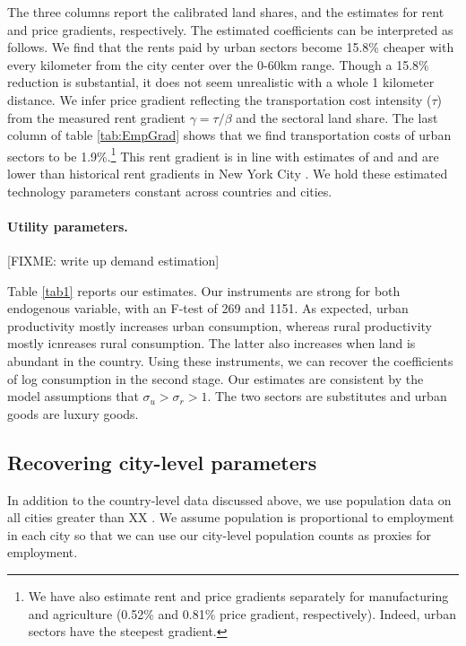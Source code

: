 \documentclass[12pt]{article}
\begin{document}
The three columns report the calibrated land shares, and the estimates for rent and price gradients, respectively. The estimated coefficients can be interpreted as follows. We find that the rents paid by urban sectors become 15.8\% cheaper with every kilometer from the city center over the 0-60km range. Though a 15.8\% reduction is substantial, it does not seem unrealistic with a whole 1 kilometer distance. We infer price gradient reflecting the transportation cost intensity ($\tau$) from the measured rent gradient $\gamma=\tau/\beta$ and the sectoral land share. The last column of table \ref{tab:EmpGrad} shows that we find transportation costs of urban sectors to be 1.9\%.\footnote{We have also estimate rent and price gradients separately for manufacturing and agriculture (0.52\% and 0.81\% price gradient, respectively). Indeed, urban sectors have the steepest gradient.} This rent gradient is in line with estimates of  and  and are lower than historical rent gradients in New York City \cite{Atack1998}. We hold these estimated technology parameters constant across countries and cities.

\paragraph{Utility parameters.}
[FIXME: write up demand estimation]



Table \ref{tab1} reports our estimates. Our instruments are strong for both endogenous variable, with an F-test of 269 and 1151. As expected, urban productivity mostly increases urban consumption, whereas rural productivity mostly icnreases rural consumption. The latter also increases when land is abundant in the country. Using these instruments, we can recover the coefficients of log consumption in the second stage. Our estimates are consistent by the model assumptions that $\sigma_u>\sigma_r>1$. The two sectors are substitutes and urban goods are luxury goods.

\subsection{Recovering city-level parameters}
In addition to the country-level data discussed above, we use population data on all cities greater than XX \cite{}. We assume population is proportional to employment in each city so that we can use our city-level population counts as proxies for employment. 
\end{document}
